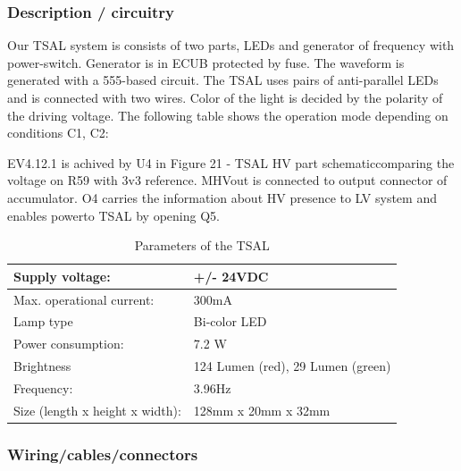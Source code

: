 \subsubsection{Description / circuitry}

Our TSAL system is consists of two parts, LEDs and generator of frequency with power-switch. Generator is in ECUB protected by fuse. The waveform is generated with a 555-based circuit. The TSAL uses pairs of anti-parallel LEDs and is connected with two wires. Color of the light is decided by the polarity of the driving voltage. The following table shows the operation mode depending on conditions C1, C2:


EV4.12.1 is achived by U4 in Figure 21 - TSAL HV part schematiccomparing the voltage on R59 with 3v3 reference. MHVout is connected to output connector of accumulator. O4 carries the information about HV presence to LV system and enables powerto TSAL by opening Q5.
\begin{table}[H]
	\centering
	\caption{Parameters of the TSAL}
	\begin{tabularx}{\textwidth}{|X|X|}
		\hline
		Supply voltage: & +/- 24VDC \\[\TableSize]
		\hline
		Max. operational current: & 300mA \\[\TableSize]
		\hline
		Lamp type & Bi-color LED \\[\TableSize]
		\hline
		Power consumption: & 7.2 W \\[\TableSize]
		\hline
		Brightness & 124 Lumen (red), 29 Lumen (green) \\[\TableSize]
		\hline
		Frequency: & 3.96Hz \\[\TableSize]
		\hline
		Size (length x height x width): & 128mm x 20mm x 32mm \\[\TableSize]
		\hline
	\end{tabularx}%
	\label{tab:TSAL}%
\end{table}%

\subsubsection{Wiring/cables/connectors}

